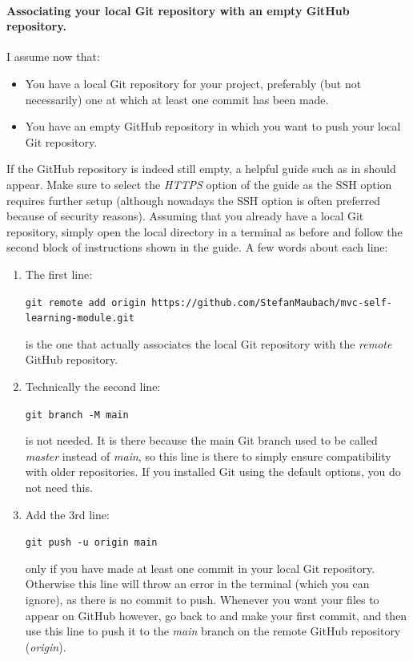 \documentclass[a4paper,10pt]{article}
\begin{document}
\paragraph{Associating your local Git repository with an empty GitHub repository.} I assume now that:
\begin{itemize}
    \item You have a local Git repository for your project, preferably (but not necessarily) one at which at least one commit has been made.
    \item You have an empty GitHub repository in which you want to push your local Git repository.
\end{itemize}
If the GitHub repository is indeed still empty, a helpful guide such as in  should appear. Make sure to select the \emph{HTTPS} option of the guide as the SSH option requires further setup (although nowadays the SSH option is often preferred because of security reasons). Assuming that you already have a local Git repository, simply open the local directory in a terminal as before and follow the second block of instructions shown in the guide. A few words about each line:
\begin{enumerate}
    \item The first line:

    \texttt{git remote add origin https://github.com/StefanMaubach/mvc-self-learning-module.git}
    
    is the one that actually associates the local Git repository with the \emph{remote} GitHub repository.
    
    \item Technically the second line:
    
    \texttt{git branch -M main}
    
    is not needed. It is there because the main Git branch used to be called \emph{master} instead of \emph{main}, so this line is there to simply ensure compatibility with older repositories. If you installed Git using the default options, you do not need this.

    \item Add the 3rd line:

    \texttt{git push -u origin main}

    only if you have made at least one commit in your local Git repository. Otherwise this line will throw an error in the terminal (which you can ignore), as there is no commit to push. Whenever you want your files to appear on GitHub however, go back to  and make your first commit, and then use this line to push it to the \emph{main} branch on the remote GitHub repository (\emph{origin}).
\end{enumerate}
\end{document}
